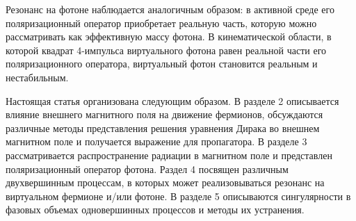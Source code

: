 Резонанс на фотоне наблюдается аналогичным образом: в активной среде его поляризационный оператор приобретает реальную часть, которую можно рассматривать как эффективную массу фотона. В кинематической 
области, в которой квадрат 4-импульса виртуального фотона равен реальной части его поляризационного оператора, виртуальный фотон становится реальным и нестабильным.

Настоящая статья организована следующим образом. В разделе 2 описывается влияние внешнего магнитного поля на движение фермионов, обсуждаются различные методы представления решения уравнения Дирака во внешнем магнитном поле и получается выражение для пропагатора. В разделе 3 рассматривается распространение радиации в магнитном поле и представлен поляризационный оператор фотона. Раздел 4 посвящен различным двухвершинным процессам, в которых может 
реализовываться резонанс на виртуальном фермионе и/или фотоне. В разделе 5 описываются сингулярности в фазовых объемах одновершинных процессов и методы их устранения.